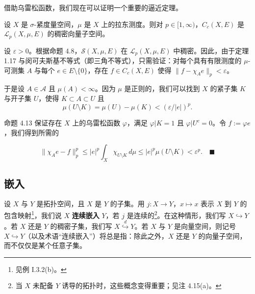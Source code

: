 借助乌雷松函数，我们现在可以证明一个重要的逼近定理。

\begin{theorem}

设 $ X $ 是 $ \sigma $-紧度量空间，$ \mu $ 是 $ X $ 上的拉东测度。则对 $ p \in [1, \infty) $，$ C_c(X, E) $ 是 $ \mathcal{L}_p(X, \mu, E) $ 的稠密向量子空间。

\proofhead
设 $ \varepsilon > 0 $。根据命题 4.8，$ \mathcal{S}(X, \mu, E) $ 在 $ \mathcal{L}_p(X, \mu, E) $ 中稠密。因此，由于定理 1.17 与闵可夫斯基不等式（即三角不等式），只需验证：对每个具有有限测度的 $ \mu $-可测集 $ A $ 与每个 $ e \in E \setminus \{0\} $，存在 $ f \in C_c(X, E) $ 使得 $ \|f - \chi_A e\|_p < \varepsilon $。

于是设 $ A \in \mathcal{A} $ 且 $ \mu(A) < \infty $。因为 $ \mu $ 是正则的，我们可以找到 $ X $ 的紧子集 $ K $ 与开子集 $ U $，使得 $ K \subset A \subset U $ 且
\[
\mu(U \setminus K) = \mu(U) - \mu(K) < (\varepsilon/|e|)^p .
\]

命题 4.13 保证存在 $ X $ 上的乌雷松函数 $ \varphi $，满足 $ \varphi|K = 1 $ 且 $ \varphi|U^c = 0 $。令 $ f := \varphi e $，我们得到所需的

\[
\|\chi_A e - f\|_p^p \le |e|^p \int_X \chi_{U \setminus K} \, d\mu \le |e|^p \mu(U \setminus K) < \varepsilon^p .\quad\blacksquare
\]
\end{theorem}

\subsection*{嵌入}

设 $ X $ 与 $ Y $ 是拓扑空间，且 $ X $ 是 $ Y $ 的子集。用 $ j : X \to Y $，$ x \mapsto x $ 表示 $ X $ 到 $ Y $ 的包含映射\footnote{见例 I.3.2(b)。}，我们说 $ X $ \textbf{连续嵌入} $ Y $，若 $ j $ 是连续的\footnote{当 $ X $ 未配备 $ Y $ 诱导的拓扑时，这些概念变得重要；见注 4.15(a)。}。在这种情形，我们写 $ X \hookrightarrow Y $。若 $ X $ 还是 $ Y $ 的稠密子集，我们写 $ X \overset{d}{\hookrightarrow} Y $。若 $ X $ 与 $ Y $ 是向量空间，则记号 $ X \hookrightarrow Y $（以及术语“连续嵌入”）将总是指：除此之外，$ X $ 还是 $ Y $ 的向量子空间，而不仅仅是某个任意子集。

